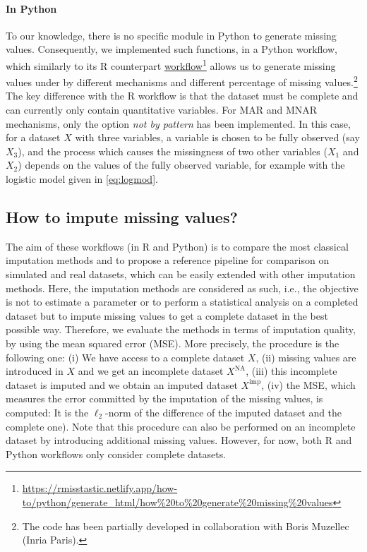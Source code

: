 \paragraph*{In {Python}} To our knowledge, there is no specific module in {Python} to generate missing values.
Consequently, we implemented such functions, in a {Python} workflow, which similarly to its {R} counterpart  \href{https://rmisstastic.netlify.app/how-to/python/generate_html/how\%20to\%20generate\%20missing\%20values}{workflow}\footnote{\url{https://rmisstastic.netlify.app/how-to/python/generate_html/how\%20to\%20generate\%20missing\%20values}} allows us to generate missing values under by different mechanisms and different percentage of missing values.\footnote{The code has been partially developed in collaboration with Boris Muzellec (Inria Paris).} The key difference with the {R} workflow is that the dataset must be complete and can currently only contain quantitative variables. For MAR and MNAR mechanisms, only the option \textit{not by pattern} has been implemented. In this case, for a dataset $X$ with three variables, a variable is chosen to be fully observed (say $X_3$), and the process which causes the missingness of two other variables ($X_1$ and $X_2$) depends on the values of the fully observed variable, for example with the logistic model given in \eqref{eq:logmod}.




\subsection{How to impute missing values?}
\label{sec:howtoimp}

The aim of these workflows (in {R} and {Python}) is to compare the most classical imputation methods and to propose a reference pipeline for comparison on simulated and real datasets, which can be easily extended with other imputation methods. 
Here, the imputation methods are considered as such, i.e., the objective is not to estimate a parameter or to perform a statistical analysis on a completed dataset but to impute missing values to get a complete dataset in the best possible way. Therefore, we evaluate the methods in terms of imputation quality, by using the mean squared error (MSE). More precisely, the procedure is the following one: (i) We have access to a complete dataset $X$, (ii) missing values are introduced in $X$ and we get an incomplete dataset $X^{\mathrm{NA}}$, (iii) this incomplete dataset is imputed and we obtain an imputed dataset $X^{\mathrm{imp}}$, (iv) the MSE, which measures the error committed by the imputation of the missing values, is computed: It is the $\ell_2$-norm of the difference of the imputed dataset and the complete one). Note that this procedure can also be performed on an incomplete dataset by introducing additional missing values. However, for now, both {R} and {Python} workflows only consider complete datasets.

